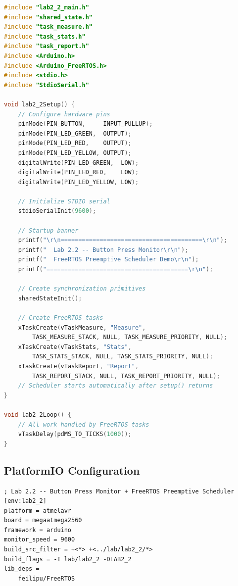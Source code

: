 \begin{lstlisting}[language=C++, caption=lab/lab2\_2/lab2\_2\_main.cpp --- Lab 2.2 setup and task creation, label=lst:lab2_2_main]
#include "lab2_2_main.h"
#include "shared_state.h"
#include "task_measure.h"
#include "task_stats.h"
#include "task_report.h"
#include <Arduino.h>
#include <Arduino_FreeRTOS.h>
#include <stdio.h>
#include "StdioSerial.h"

void lab2_2Setup() {
    // Configure hardware pins
    pinMode(PIN_BUTTON,     INPUT_PULLUP);
    pinMode(PIN_LED_GREEN,  OUTPUT);
    pinMode(PIN_LED_RED,    OUTPUT);
    pinMode(PIN_LED_YELLOW, OUTPUT);
    digitalWrite(PIN_LED_GREEN,  LOW);
    digitalWrite(PIN_LED_RED,    LOW);
    digitalWrite(PIN_LED_YELLOW, LOW);

    // Initialize STDIO serial
    stdioSerialInit(9600);

    // Startup banner
    printf("\r\n========================================\r\n");
    printf("  Lab 2.2 -- Button Press Monitor\r\n");
    printf("  FreeRTOS Preemptive Scheduler Demo\r\n");
    printf("========================================\r\n");

    // Create synchronization primitives
    sharedStateInit();

    // Create FreeRTOS tasks
    xTaskCreate(vTaskMeasure, "Measure",
        TASK_MEASURE_STACK, NULL, TASK_MEASURE_PRIORITY, NULL);
    xTaskCreate(vTaskStats, "Stats",
        TASK_STATS_STACK, NULL, TASK_STATS_PRIORITY, NULL);
    xTaskCreate(vTaskReport, "Report",
        TASK_REPORT_STACK, NULL, TASK_REPORT_PRIORITY, NULL);
    // Scheduler starts automatically after setup() returns
}

void lab2_2Loop() {
    // All work handled by FreeRTOS tasks
    vTaskDelay(pdMS_TO_TICKS(1000));
}
\end{lstlisting}

\subsection{PlatformIO Configuration}

\begin{lstlisting}[language={}, caption=platformio.ini --- Lab 2.2 environment (excerpt), label=lst:platformio_ini]
; Lab 2.2 -- Button Press Monitor + FreeRTOS Preemptive Scheduler
[env:lab2_2]
platform = atmelavr
board = megaatmega2560
framework = arduino
monitor_speed = 9600
build_src_filter = +<*> +<../lab/lab2_2/*>
build_flags = -I lab/lab2_2 -DLAB2_2
lib_deps =
    feilipu/FreeRTOS
\end{lstlisting}
